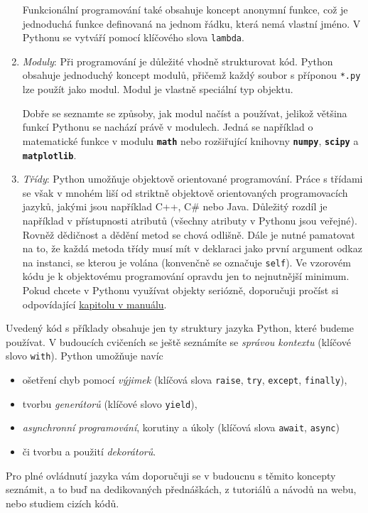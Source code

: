\documentclass[a4paper,11pt,twoside]{article}
\def\code#1{\textnormal{\texttt{#1}}}
\def\file#1{\textnormal{\textbf{\texttt{#1}}}}
\theoremstyle{red}
\theoremstyle{green}
\begin{document}
\begin{enumerate}
            Funkcionální programování také obsahuje koncept anonymní funkce, což je jednoduchá funkce definovaná na jednom řádku, která nemá vlastní jméno.
            V Pythonu se vytváří pomocí klíčového slova \code{lambda}.

        \item 
            \emph{Moduly}: Při programování je důležité vhodně strukturovat kód.
            Python obsahuje jednoduchý koncept modulů, přičemž každý soubor s příponou \code{*.py} lze použít jako modul.
            Modul je vlastně speciální typ objektu.

            Dobře se seznamte se způsoby, jak modul načíst a používat, jelikož většina funkcí Pythonu se nachází právě v modulech.
            Jedná se například o matematické funkce v modulu \file{math} nebo rozšiřující knihovny \file{numpy}, \file{scipy} a \file{matplotlib}.

        \item 
            \emph{Třídy}: Python umožňuje objektově orientované programování.
            Práce s třídami se však v mnohém liší od striktně objektově orientovaných programovacích jazyků, jakými jsou například C++, C\# nebo Java.
            Důležitý rozdíl je například v přístupnosti atributů (všechny atributy v Pythonu jsou veřejné).
            Rovněž dědičnost a dědění metod se chová odlišně.
            Dále je nutné pamatovat na to, že každá metoda třídy musí mít v deklaraci jako první argument odkaz na instanci, se kterou je volána (konvenčně se označuje \code{self}).
            Ve vzorovém kódu je k objektovému programování opravdu jen to nejnutnější minimum.
            Pokud chcete v Pythonu využívat objekty seriózně, doporučuji pročíst si odpovídající \href{https://docs.python.org/3/tutorial/classes.html}{kapitolu v manuálu}.
    \end{enumerate}

    Uvedený kód s příklady obsahuje jen ty struktury jazyka Python, které budeme používat.
    V budoucích cvičeních se ještě seznámíte se \emph{správou kontextu} (klíčové slovo \code{with}).
    Python umožňuje navíc 
    \begin{itemize}
        \item ošetření chyb pomocí \emph{výjimek} (klíčová slova \code{raise}, \code{try}, \code{except}, \code{finally}),
        \item tvorbu \emph{generátorů} (klíčové slovo \code{yield}),
        \item \emph{asynchronní programování}, korutiny a úkoly (klíčová slova \code{await}, \code{async})
        \item či tvorbu a použití \emph{dekorátorů}.
    \end{itemize}
    Pro plné ovládnutí jazyka vám doporučuji se v budoucnu s těmito koncepty seznámit, a to buď na dedikovaných přednáškách, z tutoriálů a návodů na webu, nebo studiem cizích kódů.
\end{document}
